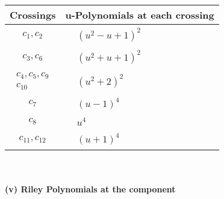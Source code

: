 \documentclass[1p]{elsarticle_modified}
\theoremstyle{definition}
\begin{document}
\begin{tabular}{m{50pt}|m{274pt}}
Crossings & \hspace{64pt}u-Polynomials at each crossing \\
\hline $$\begin{aligned}c_{1},c_{2}\end{aligned}$$&$\begin{aligned}
&(u^2- u+1)^2
\end{aligned}$\\
\hline $$\begin{aligned}c_{3},c_{6}\end{aligned}$$&$\begin{aligned}
&(u^2+u+1)^2
\end{aligned}$\\
\hline $$\begin{aligned}c_{4},c_{5},c_{9}\\c_{10}\end{aligned}$$&$\begin{aligned}
&(u^2+2)^2
\end{aligned}$\\
\hline $$\begin{aligned}c_{7}\end{aligned}$$&$\begin{aligned}
&(u-1)^4
\end{aligned}$\\
\hline $$\begin{aligned}c_{8}\end{aligned}$$&$\begin{aligned}
&u^4
\end{aligned}$\\
\hline $$\begin{aligned}c_{11},c_{12}\end{aligned}$$&$\begin{aligned}
&(u+1)^4
\end{aligned}$\\
\hline
\end{tabular}\\~\\
\newpage\renewcommand{\arraystretch}{1}
\flushleft \textbf{(v) Riley Polynomials at the component}\newline \\
\end{document}
